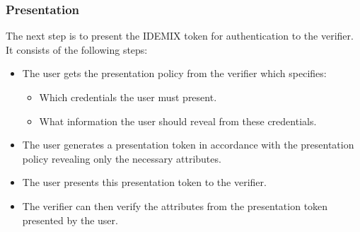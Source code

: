 \subsubsection{Presentation}
The next step is to present the IDEMIX token for authentication to the verifier. It consists of the following steps:
\begin{itemize}
	\item The user gets the presentation policy from the verifier which specifies:
	\begin{itemize}
		\item Which credentials the user must present.
		\item What information the user should reveal from these credentials.
	\end{itemize}
	\item The user generates a presentation token in accordance with the presentation policy revealing only the necessary attributes. 
	\item The user presents this presentation token to the verifier.
	\item The verifier can then verify the attributes from the presentation token presented by the user.
\end{itemize}
